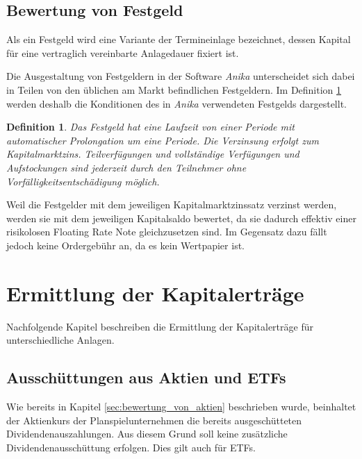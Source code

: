 \documentclass[12pt, a4paper]{article}
\theoremstyle{plain}
\newtheorem{definition}{Definition}
\begin{document}
\subsection{Bewertung von Festgeld}
\label{sec:bewertung_von_festgeldern}

Als ein Festgeld wird eine Variante der Termineinlage bezeichnet, dessen Kapital für eine vertraglich vereinbarte Anlagedauer fixiert ist.

Die Ausgestaltung von Festgeldern in der Software \textit{Anika} unterscheidet sich dabei in Teilen von den üblichen am Markt befindlichen Festgeldern. Im Definition \ref{def:festgeld} werden deshalb die Konditionen des in \textit{Anika} verwendeten Festgelds dargestellt.

\begin{definition}
	\label{def:festgeld}
	Das Festgeld hat eine Laufzeit von einer Periode mit automatischer Prolongation um eine Periode. Die Verzinsung erfolgt zum Kapitalmarktzins. Teilverfügungen und vollständige Verfügungen und Aufstockungen sind jederzeit durch den Teilnehmer ohne Vorfälligkeitsentschädigung möglich. 
\end{definition}

Weil die Festgelder mit dem jeweiligen Kapitalmarktzinssatz verzinst werden, werden sie mit dem jeweiligen Kapitalsaldo bewertet, da sie dadurch effektiv einer risikolosen Floating Rate Note gleichzusetzen sind. Im Gegensatz dazu fällt jedoch keine Ordergebühr an, da es kein Wertpapier ist.

\section{Ermittlung der Kapitalerträge}
\label{sec:ermittlung_von_wertpapierertraegen}

Nachfolgende Kapitel beschreiben die Ermittlung der Kapitalerträge für unterschiedliche Anlagen.

\subsection{Ausschüttungen aus Aktien und ETFs}
\label{sec:ausschuettung_aus_aktie}
Wie bereits in Kapitel \ref{sec:bewertung_von_aktien} beschrieben wurde, beinhaltet der Aktienkurs der Planspielunternehmen die bereits ausgeschütteten Dividendenauszahlungen. Aus diesem Grund soll keine zusätzliche Dividendenausschüttung erfolgen. Dies gilt auch für \glspl{ETF}.
\end{document}
